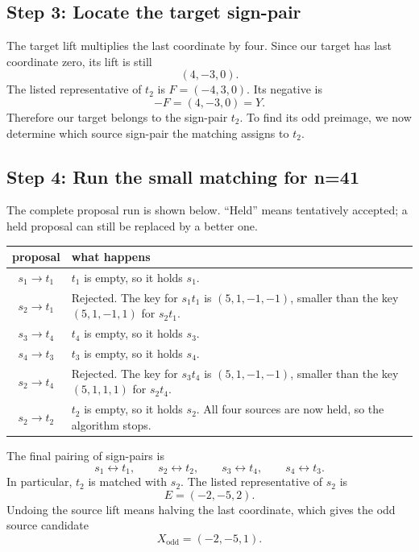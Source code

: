 \documentclass[11pt]{amsart}
\begin{document}
\subsection*{Step 3: Locate the target sign-pair}

The target lift multiplies the last coordinate by four.  Since our target has
last coordinate zero, its lift is still
\[
 (4,-3,0).
\]
The listed representative of \(t_2\) is \(F=(-4,3,0)\).  Its negative is
\[
 -F=(4,-3,0)=Y.
\]
Therefore our target belongs to the sign-pair \(t_2\).  To find its odd
preimage, we now determine which source sign-pair the matching assigns to
\(t_2\).

\subsection*{Step 4: Run the small matching for n=41}

The complete proposal run is shown below.  ``Held'' means tentatively
accepted; a held proposal can still be replaced by a better one.

\begin{center}
\small
\renewcommand{\arraystretch}{1.24}
\begin{tabular}{@{}c p{}@{}}
\toprule
proposal & what happens \\
\midrule
\(s_1\to t_1\) & \(t_1\) is empty, so it holds \(s_1\). \\
\(s_2\to t_1\) & Rejected.  The key for \(s_1t_1\) is
\((5,1,-1,-1)\), smaller than the key \((5,1,-1,1)\) for \(s_2t_1\). \\
\(s_3\to t_4\) & \(t_4\) is empty, so it holds \(s_3\). \\
\(s_4\to t_3\) & \(t_3\) is empty, so it holds \(s_4\). \\
\(s_2\to t_4\) & Rejected.  The key for \(s_3t_4\) is
\((5,1,-1,-1)\), smaller than the key \((5,1,1,1)\) for \(s_2t_4\). \\
\(s_2\to t_2\) & \(t_2\) is empty, so it holds \(s_2\).  All four sources
are now held, so the algorithm stops. \\
\bottomrule
\end{tabular}
\end{center}

The final pairing of sign-pairs is
\[
 s_1\leftrightarrow t_1,\qquad
 s_2\leftrightarrow t_2,\qquad
 s_3\leftrightarrow t_4,\qquad
 s_4\leftrightarrow t_3.
\]
In particular, \(t_2\) is matched with \(s_2\).  The listed representative of
\(s_2\) is
\[
 E=(-2,-5,2).
\]
Undoing the source lift means halving the last coordinate, which gives the
odd source candidate
\[
 X_{\mathrm{odd}}=(-2,-5,1).
\]
\end{document}
